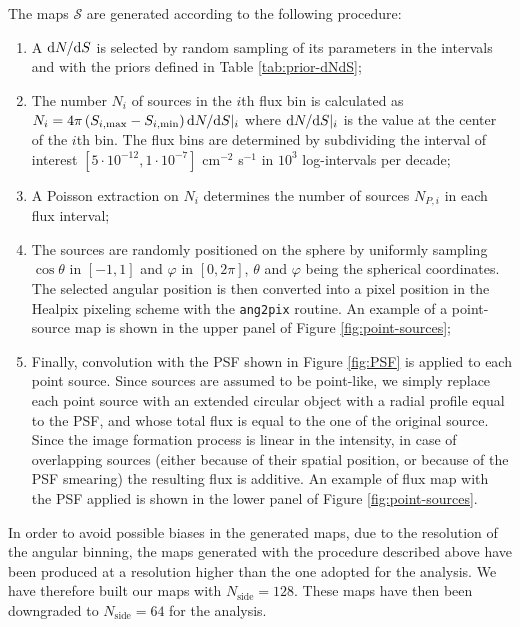 The maps $\mathcal{S}$ are generated according to the following procedure:
\begin{enumerate}
\item A $\text{d}N/\text{d}S$ is selected by random sampling of its parameters in the intervals and with the priors defined in Table \ref{tab:prior-dNdS};

\item The number $N_i$ of sources in the $i$th flux bin is calculated as $N_i = 4\pi \, (S_{i, \textrm{max}} - S_{i, \textrm{min}}) \, \text{d}N/\text{d}S|_i$ where $\text{d}N/\text{d}S|_i$ is the value at the center of the $i$th bin. The flux bins are determined by subdividing the interval of interest {$[5 \cdot 10^{-12}, 1 \cdot 10^{-7}]$ } cm$^{-2}$ s$^{-1}$ in $10^3$ log-intervals per decade;

\item A Poisson extraction on $N_i$ determines the number of sources $N_{P,i}$ in each flux interval;

\item The sources are randomly positioned on the sphere by uniformly sampling $\cos\theta$ in $[-1,1]$ and $\varphi$ in $[0, 2\pi]$, $\theta$ and $\varphi$ being the spherical coordinates. The selected angular position is then converted into a pixel position in the Healpix pixeling scheme with the \texttt{ang2pix} routine. An example of a point-source map is shown in the upper panel of Figure \ref{fig:point-sources};

\item Finally, convolution with the \fermi PSF shown in Figure \ref{fig:PSF} is applied to each point source. Since sources are assumed to be point-like, we simply replace each point source with an extended circular object with a radial profile equal to the PSF, and whose total flux is equal to the one of the original source. Since the image formation process is linear in the intensity, in case of overlapping sources (either because of their spatial position, or because of the PSF smearing) the resulting flux is additive. An example of flux map with the PSF applied is shown in the lower panel of Figure \ref{fig:point-sources}.
\end{enumerate}

In order to avoid possible biases in the generated maps, due to the resolution of the angular binning, the maps generated with the procedure described above have been produced at a resolution higher than the one adopted for the analysis. We have therefore built our maps with $N_\textrm{side} = 128$. These maps have then been downgraded to $N_\textrm{side} = 64$ for the analysis.


